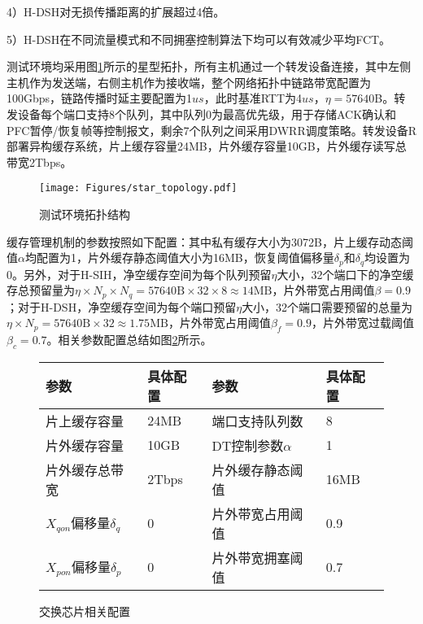 4）H-DSH对无损传播距离的扩展超过4倍。

5）H-DSH在不同流量模式和不同拥塞控制算法下均可以有效减少平均FCT。


测试环境均采用图\ref{c4:s1:ss1:fig:star topology}所示的星型拓扑，所有主机通过一个转发设备连接，其中左侧主机作为发送端，右侧主机作为接收端，整个网络拓扑中链路带宽配置为100Gbps，链路传播时延主要配置为1$us$，此时基准RTT为4$us$，$\eta=57640$B。转发设备每个端口支持8个队列，其中队列0为最高优先级，用于存储ACK确认和PFC暂停/恢复帧等控制报文，剩余7个队列之间采用DWRR调度策略。转发设备R部署异构缓存系统，片上缓存容量24MB，片外缓存容量10GB，片外缓存读写总带宽2Tbps。

\begin{figure}[H]
  \centering
  \texttt{[image: Figures/star\_topology.pdf]}
  \caption{测试环境拓扑结构}
  \label{c4:s1:ss1:fig:star topology}
\end{figure}

缓存管理机制的参数按照如下配置：其中私有缓存大小为3072B，片上缓存动态阈值$\alpha$均配置为1，片外缓存静态阈值大小为16MB，恢复阈值偏移量$\delta_p$和$\delta_q$均设置为0。另外，对于H-SIH，净空缓存空间为每个队列预留$\eta$大小，32个端口下的净空缓存总预留量为$\eta \times N_p \times N_q = 57640\text{B} \times 32 \times 8 \approx 14\text{MB}$，片外带宽占用阈值$\beta = 0.9$；对于H-DSH，净空缓存空间为每个端口预留$\eta$大小，32个端口需要预留的总量为$\eta \times N_p= 57640\text{B} \times 32 \approx 1.75\text{MB}$，片外带宽占用阈值$\beta_f = 0.9$，片外带宽过载阈值$\beta_c = 0.7$。相关参数配置总结如图\ref{fig:c4:parameter setting}所示。

\begin{figure}[H]
  \begin{table}[H]
      \begin{tabularx}{\textwidth}{YYYY}
      \toprule
          \textbf{参数} & \textbf{具体配置} & \textbf{参数} & \textbf{具体配置} \\
      \midrule
          片上缓存容量 & 24MB & 端口支持队列数 & 8 \\
          片外缓存容量 & 10GB  & DT控制参数$\alpha$ & 1\\
          片外缓存总带宽 & 2Tbps & 片外缓存静态阈值 & 16MB \\
          $X_{qon}$偏移量$\delta_q$ & 0 & 片外带宽占用阈值 & 0.9 \\
          $X_{pon}$偏移量$\delta_p$ & 0 & 片外带宽拥塞阈值 & 0.7 \\
      \bottomrule
      \end{tabularx}
  \end{table}
  \caption{交换芯片相关配置}
  \label{fig:c4:parameter setting}
\end{figure}

